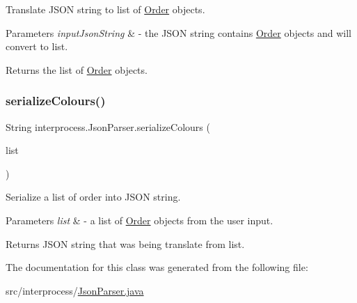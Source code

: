 Translate J\+S\+ON string to list of \hyperlink{classinterprocess_1_1_order}{Order} objects. 
\begin{DoxyParams}{Parameters}
{\em input\+Json\+String} & -\/ the J\+S\+ON string contains \hyperlink{classinterprocess_1_1_order}{Order} objects and will convert to list. \\
\hline
\end{DoxyParams}
\begin{DoxyReturn}{Returns}
the list of \hyperlink{classinterprocess_1_1_order}{Order} objects. 
\end{DoxyReturn}
\mbox{\label{classinterprocess_1_1_json_parser_a71acd9266626b51692367dcadab6bdb3}} 
\subsubsection{\texorpdfstring{serialize\+Colours()}{serializeColours()}}
{\footnotesize\ttfamily String interprocess.\+Json\+Parser.\+serialize\+Colours (\begin{DoxyParamCaption}\item[{List$<$ \hyperlink{classinterprocess_1_1_order}{Order} $>$}]{list }\end{DoxyParamCaption})\hspace{0.3cm}{\ttfamily [inline]}}

Serialize a list of order into J\+S\+ON string. 
\begin{DoxyParams}{Parameters}
{\em list} & -\/ a list of \hyperlink{classinterprocess_1_1_order}{Order} objects from the user input. \\
\hline
\end{DoxyParams}
\begin{DoxyReturn}{Returns}
J\+S\+ON string that was being translate from list. 
\end{DoxyReturn}


The documentation for this class was generated from the following file\+:\begin{DoxyCompactItemize}
\item 
src/interprocess/\hyperlink{_json_parser_8java}{Json\+Parser.\+java}\end{DoxyCompactItemize}
